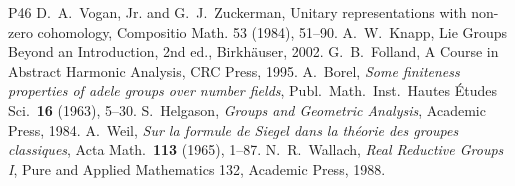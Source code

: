 \documentclass[10pt]{amsart}
\theoremstyle{definition}
\theoremstyle{remark}
\begin{document}
\begin{thebibliography}{P46}
 D.~A.~Vogan, Jr. and G.~J.~Zuckerman, Unitary representations with non-zero cohomology, Compositio Math. 53 (1984), 51--90.
 A.~W.~Knapp, Lie Groups Beyond an Introduction, 2nd ed., Birkh\"auser, 2002.
 G.~B.~Folland, A Course in Abstract Harmonic Analysis, CRC Press, 1995.
 A.~Borel, \emph{Some finiteness properties of adele groups over number
fields}, Publ.\ Math.\ Inst.\ Hautes \'Etudes Sci.\ \textbf{16} (1963), 5--30.
 S.~Helgason, \emph{Groups and Geometric Analysis}, Academic Press, 1984.
 A.~Weil, \emph{Sur la formule de Siegel dans la th\'eorie des groupes
classiques}, Acta Math.\ \textbf{113} (1965), 1--87.
 N.~R.~Wallach, \emph{Real Reductive Groups I}, Pure and Applied Mathematics 132, Academic Press, 1988.
\end{thebibliography}
\end{document}
